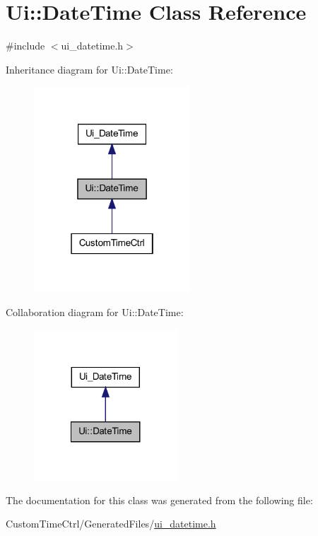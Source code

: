 \hypertarget{class_ui_1_1_date_time}{
\section{Ui::DateTime Class Reference}
\label{class_ui_1_1_date_time}
}


{\ttfamily \#include $<$ui\_\-datetime.h$>$}



Inheritance diagram for Ui::DateTime:\nopagebreak
\begin{figure}[H]
\begin{center}
\leavevmode
\includegraphics[width=166pt]{class_ui_1_1_date_time__inherit__graph}
\end{center}
\end{figure}


Collaboration diagram for Ui::DateTime:\nopagebreak
\begin{figure}[H]
\begin{center}
\leavevmode
\includegraphics[width=152pt]{class_ui_1_1_date_time__coll__graph}
\end{center}
\end{figure}


The documentation for this class was generated from the following file:\begin{DoxyCompactItemize}
\item 
CustomTimeCtrl/GeneratedFiles/\hyperlink{ui__datetime_8h}{ui\_\-datetime.h}\end{DoxyCompactItemize}
